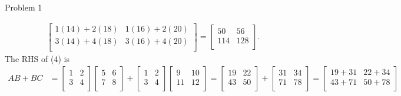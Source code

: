 \begin{problem}{Problem 1}
\begin{Highlight}[Solution]
\begin{align*}
\begin{bmatrix}
                1(14) + 2(18) & 1(16) + 2(20) \\
                3(14) + 4(18) & 3(16) + 4(20) \\
            \end{bmatrix}
            = 
            \begin{bmatrix}
                50 & 56 \\
                114 & 128 \\
            \end{bmatrix}.
        \end{align*}
        The RHS of (4) is
        \begin{align*}
            AB + BC & = 
            \begin{bmatrix}
                1 & 2 \\
                3 & 4 \\
            \end{bmatrix}
            \begin{bmatrix}
                5 & 6 \\
                7 & 8 \\
            \end{bmatrix}
            +
            \begin{bmatrix}
                1 & 2 \\
                3 & 4 \\
            \end{bmatrix}
            \begin{bmatrix}
                9 & 10 \\
                11 & 12 \\
            \end{bmatrix}
            = 
            \begin{bmatrix}
                19 & 22 \\
                43 & 50 \\
            \end{bmatrix}
            + 
            \begin{bmatrix}
                31 & 34 \\
                71 & 78 \\
            \end{bmatrix}
            =
            \begin{bmatrix}
                19 + 31 & 22 + 34 \\
                43 + 71 & 50 + 78 \\
            \end{bmatrix} \\

\end{align*}
\end{Highlight}
\end{problem}
